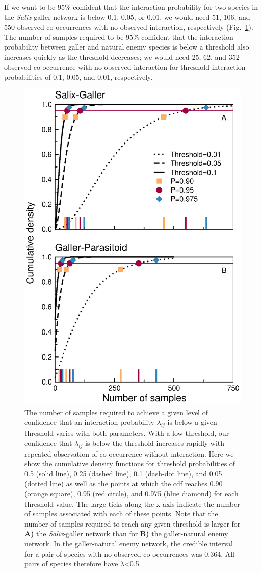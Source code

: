 \documentclass[12pt]{article}
\begin{document}
      If we want to be 95\% confident that the interaction probability for two species in the \emph{Salix}-galler network is below 0.1, 0.05, or 0.01, we would need 51, 106, and 550 observed co-occurrences with no observed interaction, respectively (Fig.~\ref{Salix_cdfs}). The number of samples required to be 95\% confident that the interaction probability between galler and natural enemy species is below a threshold also increases quickly as the threshold decreases; we would need 25, 62, and 352 observed co-occurrence with no observed interaction for threshold interaction probabilities of 0.1, 0.05, and 0.01, respectively. 


      \begin{figure}[h!]
        \caption{The number of samples required to achieve a given level of confidence that an interaction probability $\lambda_{ij}$ is below a given threshold varies with both parameters. With a low threshold, our confidence that $\lambda_{ij}$ is below the threshold increases rapidly with repeated observation of co-occurrence without interaction. Here we show the cumulative density functions for threshold probabilities of 0.5 (solid line), 0.25 (dashed line), 0.1 (dash-dot line), and 0.05 (dotted line) as well as the points at which the cdf reaches 0.90 (orange square), 0.95 (red circle), and 0.975 (blue diamond) for each threshold value. The large ticks along the x-axis indicate the number of samples associated with each of these points. Note that the number of samples required to reach any given threshold is larger for \textbf{A)} the \emph{Salix}-galler network than for \textbf{B)} the galler-natural enemy network. In the galler-natural enemy network, the credible interval for a pair of species with no observed co-occurrences was 0.364. All pairs of species therefore have $\lambda$\textless0.5.}
        \label{Salix_cdfs}
        \begin{center}
        \includegraphics[width=.65\textwidth]{figures/Salix_Galler_samples_and_cdfs.eps}
        \end{center}
        \end{figure}
\end{document}
